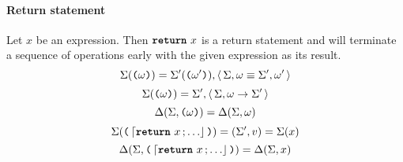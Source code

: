 \paragraph{Return statement}
Let $x$ be an expression.
Then $\texttt{\textbf{return}}~x$ is a return statement and will terminate a sequence of operations early with the given expression as its result.
$$
\Sigma(\texttt{(} \omega \texttt{)}) = \Sigma'(\texttt{(} \omega' \texttt{)}),
	\left\langle\, \Sigma, \omega \equiv \Sigma', \omega' \,\right\rangle
$$
$$
\Sigma(\texttt{(} \omega \texttt{)}) = \Sigma',
	\left\langle\, \Sigma, \omega \to \Sigma' \,\right\rangle
$$
$$
\Delta(\Sigma, \texttt{(} \omega \texttt{)}) = \Delta(\Sigma, \omega)
$$
$$
\Sigma(\ttlparen \stmt{\retstmt{x}}{\ldots} \ttrparen) = (\Sigma', v) = \Sigma(x)
$$
$$
\Delta(\Sigma, \ttlparen \stmt{\retstmt{x}}{\ldots} \ttrparen) = \Delta(\Sigma, x)
$$
